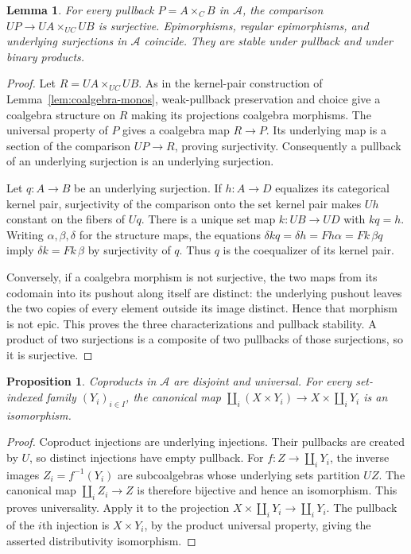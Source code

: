 \documentclass[11pt]{article}
\newtheorem{lemma}[theorem]{Lemma}
\newtheorem{proposition}[theorem]{Proposition}
\begin{document}
\begin{lemma}\label{lem:coalgebra-surjections}
For every pullback $P=A\times_C B$ in $\mathcal A$, the comparison
$UP\to UA\times_{UC}UB$ is surjective. Epimorphisms, regular epimorphisms, and underlying surjections in $\mathcal A$ coincide. They are stable under pullback and under binary products.
\end{lemma}
\begin{proof}
Let $R=UA\times_{UC}UB$. As in the kernel-pair construction of Lemma~\ref{lem:coalgebra-monos}, weak-pullback preservation and choice give a coalgebra structure on $R$ making its projections coalgebra morphisms. The universal property of $P$ gives a coalgebra map $R\to P$. Its underlying map is a section of the comparison $UP\to R$, proving surjectivity. Consequently a pullback of an underlying surjection is an underlying surjection.

Let $q:A\to B$ be an underlying surjection. If $h:A\to D$ equalizes its categorical kernel pair, surjectivity of the comparison onto the set kernel pair makes $Uh$ constant on the fibers of $Uq$. There is a unique set map $k:UB\to UD$ with $kq=h$. Writing $\alpha,\beta,\delta$ for the structure maps, the equations
$\delta kq=\delta h=Fh\alpha=Fk\,\beta q$ imply $\delta k=Fk\,\beta$ by surjectivity of $q$. Thus $q$ is the coequalizer of its kernel pair.

Conversely, if a coalgebra morphism is not surjective, the two maps from its codomain into its pushout along itself are distinct: the underlying pushout leaves the two copies of every element outside its image distinct. Hence that morphism is not epic. This proves the three characterizations and pullback stability. A product of two surjections is a composite of two pullbacks of those surjections, so it is surjective.
\end{proof}

\begin{proposition}\label{prop:coalgebra-distribution}
Coproducts in $\mathcal A$ are disjoint and universal. For every set-indexed family $(Y_i)_{i\in I}$, the canonical map
$\coprod_i(X\times Y_i)\to X\times\coprod_iY_i$ is an isomorphism.
\end{proposition}
\begin{proof}
Coproduct injections are underlying injections. Their pullbacks are created by $U$, so distinct injections have empty pullback. For $f:Z\to\coprod_iY_i$, the inverse images $Z_i=f^{-1}(Y_i)$ are subcoalgebras whose underlying sets partition $UZ$. The canonical map $\coprod_iZ_i\to Z$ is therefore bijective and hence an isomorphism. This proves universality. Apply it to the projection $X\times\coprod_iY_i\to\coprod_iY_i$. The pullback of the $i$th injection is $X\times Y_i$, by the product universal property, giving the asserted distributivity isomorphism.
\end{proof}
\end{document}
